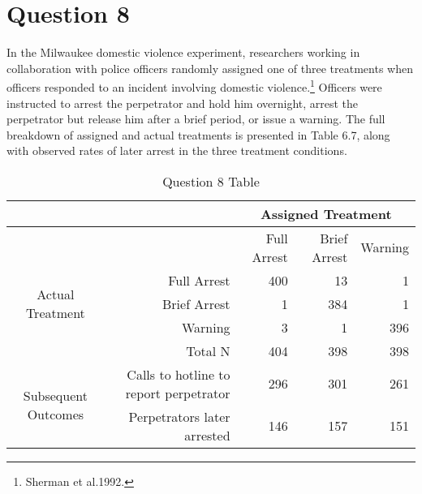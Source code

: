 \documentclass[11pt,notitlepage]{article}\usepackage[]{graphicx}\usepackage[]{color}
\begin{document}
\section*{Question 8}
In the Milwaukee domestic violence experiment, researchers working in collaboration with police officers randomly assigned one of three treatments when officers responded to an incident involving domestic violence.\footnote{Sherman et al.1992.} Officers were instructed to arrest the perpetrator and hold him overnight, arrest the perpetrator but release him after a brief period, or issue a warning. The full breakdown of assigned and actual treatments is presented in Table 6.7, along with observed rates of later arrest in the three treatment conditions.

\begin{table}[H]
  \centering
  \caption{Question 8 Table}
    \begin{tabular}{rrrrr}
    \toprule
          &       & \multicolumn{3}{c}{Assigned Treatment} \\
    \midrule
          &       & Full Arrest & Brief Arrest & Warning \\
    \multicolumn{1}{c}{\multirow{3}[0]{*}{Actual Treatment}} & Full Arrest & 400   & 13    & 1 \\
    \multicolumn{1}{c}{} & Brief Arrest & 1     & 384   & 1 \\
    \multicolumn{1}{c}{} & Warning & 3     & 1     & 396 \\
          & Total N & 404   & 398   & 398 \\
    \multicolumn{1}{c}{\multirow{2}[0]{*}{Subsequent Outcomes}} & Calls to hotline to report perpetrator & 296   & 301   & 261 \\
    \multicolumn{1}{c}{} & Perpetrators later arrested & 146   & 157   & 151 \\
    \bottomrule
    \end{tabular}%
\end{table}%
\end{document}

